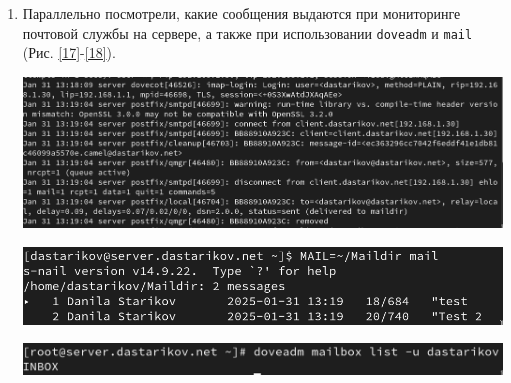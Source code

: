 \begin{enumerate}
\item Параллельно посмотрели, какие сообщения выдаются при мониторинге почтовой службы на сервере, а также при использовании \texttt{doveadm} и \texttt{mail} (Рис. \ref{17}-\ref{18}).
\begin{center}
    \centering
    \includegraphics[width=\textwidth]{../images/image16.png}
    \label{16}
\begin{center}
    \centering
    \includegraphics[width=\textwidth]{../images/image17.png}
    \label{17}
\end{center}
\begin{center}
    \centering
    \includegraphics[width=\textwidth]{../images/image18.png}
    \label{18}
\end{center}

\end{center}


\end{enumerate}
